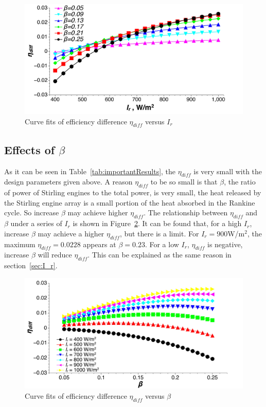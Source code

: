 \noindent \begin{figure}[htbp]
\begin{center}
	\includegraphics[width = 0.8\columnwidth, angle = 0]{fig/I_r-eta_diff}
	\caption{Curve fits of efficiency difference $\eta_{diff}$ versus $I_r$}
	\label{fig:I_r-eta_diff}
\end{center}
\end{figure}

\subsection{Effects of $\beta$}

As it can be seen in Table~\ref{tab:importantResults}, the $\eta_{diff}$ is very small with the design parameters given above. A reason $\eta_{diff}$ to be so small is that $\beta$, the ratio of power of Stirling engines to the total power, is very small, the heat released by the Stirling engine array is a small portion of the heat absorbed in the Rankine cycle. So increase $\beta$ may achieve higher $\eta_{diff}$. The relationship between $\eta_{diff}$ and $\beta$ under a series of $I_r$ is shown in Figure~\ref{fig:beta-eta_diff}. It can be found that, for a high $I_r$, increase $\beta$ may achieve a higher $\eta_{diff}$, but there is a limit. For $I_r=900$W/m$^2$, the maximum $\eta_{diff}=0.0228$ appears at $\beta=0.23$. For a low $I_r$, $\eta_{diff}$ is negative, increase $\beta$ will reduce $\eta_{diff}$. This can be explained as the same reason in section~\ref{sec:I_r}.

\noindent \begin{figure}[H]
\begin{center}
	\includegraphics[width = 0.8\columnwidth, angle = 0]{fig/beta-eta_diff}
	\caption{Curve fits of efficiency difference $\eta_{diff}$ versus $\beta$}
	\label{fig:beta-eta_diff}
\end{center}
\end{figure}

